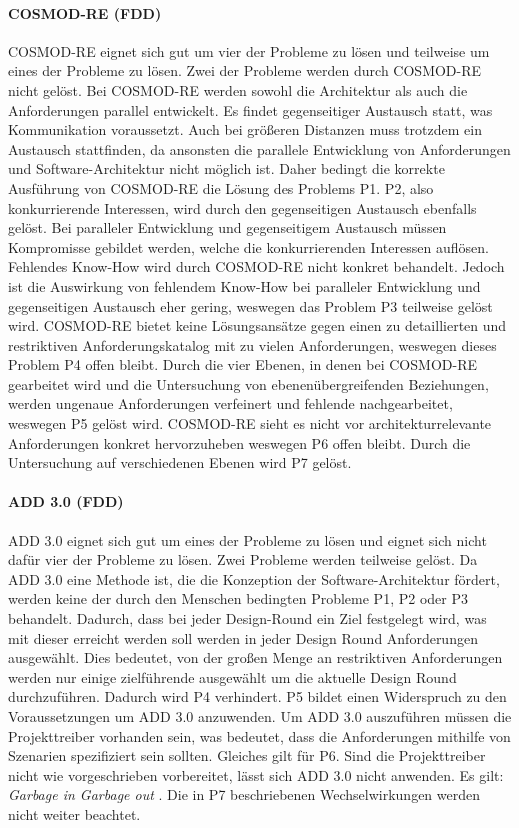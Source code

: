 \paragraph{COSMOD-RE (FDD)}
COSMOD-RE eignet sich gut um vier der Probleme zu l\"osen und teilweise um eines der Probleme zu l\"osen. Zwei der Probleme werden durch COSMOD-RE nicht gel\"ost. Bei COSMOD-RE werden sowohl die Architektur als auch die Anforderungen parallel entwickelt. Es findet gegenseitiger Austausch statt, was Kommunikation voraussetzt. Auch bei gr\"o\ss{}eren Distanzen muss trotzdem ein Austausch stattfinden, da ansonsten die parallele Entwicklung von Anforderungen und Software-Architektur nicht m\"oglich ist. Daher bedingt die korrekte Ausf\"uhrung von COSMOD-RE die L\"osung des Problems P1. P2, also konkurrierende Interessen, wird durch den gegenseitigen Austausch ebenfalls gel\"ost. Bei paralleler Entwicklung und gegenseitigem Austausch m\"ussen Kompromisse gebildet werden, welche die konkurrierenden Interessen aufl\"osen. Fehlendes Know-How wird durch COSMOD-RE nicht konkret behandelt. Jedoch ist die Auswirkung von fehlendem Know-How bei paralleler Entwicklung und gegenseitigen Austausch eher gering, weswegen das Problem P3 teilweise gel\"ost wird. COSMOD-RE bietet keine L\"osungsans\"atze gegen einen zu detaillierten und restriktiven Anforderungskatalog mit zu vielen Anforderungen, weswegen dieses Problem P4 offen bleibt. Durch die vier Ebenen, in denen bei COSMOD-RE gearbeitet wird und die Untersuchung von ebenen\"ubergreifenden Beziehungen, werden ungenaue Anforderungen verfeinert und fehlende nachgearbeitet, weswegen P5 gel\"ost wird. COSMOD-RE sieht es nicht vor architekturrelevante Anforderungen konkret hervorzuheben weswegen P6 offen bleibt. Durch die Untersuchung auf verschiedenen Ebenen wird P7 gel\"ost.\\

\paragraph{ADD 3.0 (FDD)}
ADD 3.0 eignet sich gut um eines der Probleme zu l\"osen und eignet sich nicht daf\"ur vier der Probleme zu l\"osen. Zwei Probleme werden teilweise gel\"ost. Da ADD 3.0 eine Methode ist, die die Konzeption der Software-Architektur f\"ordert, werden keine der durch den Menschen bedingten Probleme P1, P2 oder P3 behandelt. Dadurch, dass bei jeder Design-Round ein Ziel festgelegt wird, was mit dieser erreicht werden soll werden in jeder Design Round Anforderungen ausgew\"ahlt. Dies bedeutet, von der gro\ss{}en Menge an restriktiven Anforderungen werden nur einige zielf\"uhrende ausgew\"ahlt um die aktuelle Design Round durchzuf\"uhren. Dadurch wird P4 verhindert. P5 bildet einen Widerspruch zu den Voraussetzungen um ADD 3.0 anzuwenden. Um ADD 3.0 auszuf\"uhren m\"ussen die Projekttreiber vorhanden sein, was bedeutet, dass die Anforderungen mithilfe von Szenarien spezifiziert sein sollten. Gleiches gilt f\"ur P6. Sind die Projekttreiber nicht wie vorgeschrieben vorbereitet, l\"asst sich ADD 3.0 nicht anwenden. Es gilt: \emph{Garbage in Garbage out }\cite{Cer01}. Die in P7 beschriebenen Wechselwirkungen werden nicht weiter beachtet.\\
